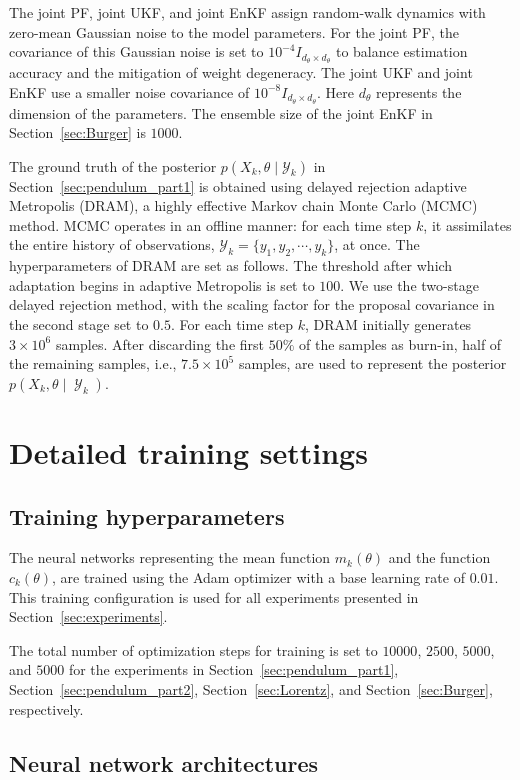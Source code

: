 \documentclass[preprint,3p,times]{elsarticle}
\DeclareMathOperator{\Y}{\mathcal{Y}}
\newcommand{\pdense}{p}
\begin{document}
The joint PF, joint UKF, and joint EnKF assign random-walk dynamics with zero-mean Gaussian noise to the model parameters. For the joint PF, the covariance of this Gaussian noise is set to $10^{-4}I_{d_\theta \times d_\theta}$ to balance estimation accuracy and the mitigation of weight degeneracy. The joint UKF and joint EnKF use a smaller noise covariance of $10^{-8}I_{d_\theta \times d_\theta}$. Here $d_\theta$ represents the dimension of the parameters. The ensemble size of the joint EnKF in Section~\ref{sec:Burger} is $1000$.

The ground truth of the posterior $\pdense(X_k,\theta \mid \mathcal{Y}_k)$ in Section~\ref{sec:pendulum_part1} is obtained using delayed rejection adaptive Metropolis (DRAM), a highly effective Markov chain Monte Carlo (MCMC) method. MCMC operates in an offline manner: for each time step $k$, it assimilates the entire history of observations, $\mathcal{Y}_k=\{y_1,y_2,\cdots,y_k\}$, at once. The hyperparameters of DRAM are set as follows. The threshold after which adaptation begins in adaptive Metropolis is set to $100$. We use the two-stage delayed rejection method, with the scaling factor for the proposal covariance in the second stage set to $0.5$. For each time step $k$, DRAM initially generates $3\times 10^6$ samples. After discarding the first $50\%$ of the samples as burn-in, half of the remaining samples, i.e., $7.5\times 10^5$ samples, are used to represent the posterior $\pdense(X_k,\theta \mid \Y_k)$.

\section{Detailed training settings}
\label{app:ep1}
\subsection{Training hyperparameters}
The neural networks representing the mean function $m_k(\theta)$ and the function $c_k(\theta)$, are trained using the Adam optimizer with a base learning rate of $0.01$. This training configuration is used for all experiments presented in Section~\ref{sec:experiments}. 

The total number of optimization steps for training is set to $10000$, $2500$, $5000$, and $5000$ for the experiments in Section~\ref{sec:pendulum_part1}, Section~\ref{sec:pendulum_part2}, Section~\ref{sec:Lorentz}, and Section~\ref{sec:Burger}, respectively.

\subsection{Neural network architectures}
\end{document}
